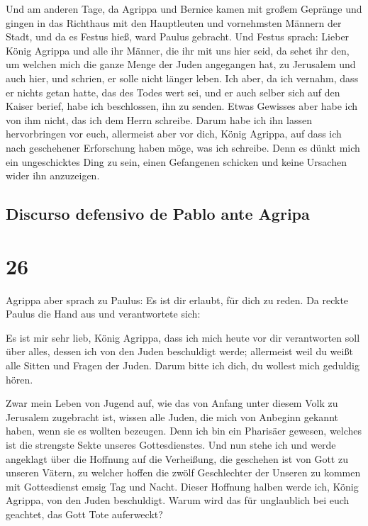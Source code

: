  Und am anderen Tage, da Agrippa und Bernice kamen mit
großem Gepränge und gingen in das Richthaus mit den Hauptleuten und
vornehmsten Männern der Stadt, und da es Festus hieß, ward Paulus
gebracht.  Und Festus sprach: Lieber König Agrippa und
alle ihr Männer, die ihr mit uns hier seid, da sehet ihr den, um welchen
mich die ganze Menge der Juden angegangen hat, zu Jerusalem und auch
hier, und schrien, er solle nicht länger leben.  Ich
aber, da ich vernahm, dass er nichts getan hatte, das des Todes wert
sei, und er auch selber sich auf den Kaiser berief, habe ich
beschlossen, ihn zu senden.  Etwas Gewisses aber habe ich
von ihm nicht, das ich dem Herrn schreibe. Darum habe ich ihn lassen
hervorbringen vor euch, allermeist aber vor dich, König Agrippa, auf
dass ich nach geschehener Erforschung haben möge, was ich schreibe.
 Denn es dünkt mich ein ungeschicktes Ding zu sein, einen
Gefangenen schicken und keine Ursachen wider ihn anzuzeigen.

\hypertarget{discurso-defensivo-de-pablo-ante-agripa}{%
\subsection{Discurso defensivo de Pablo ante
Agripa}\label{discurso-defensivo-de-pablo-ante-agripa}}

\hypertarget{section-25}{%
\section{26}\label{section-25}}

 Agrippa aber sprach zu Paulus: Es ist dir erlaubt, für
dich zu reden. Da reckte Paulus die Hand aus und verantwortete sich:

 Es ist mir sehr lieb, König Agrippa, dass ich mich heute
vor dir verantworten soll über alles, dessen ich von den Juden
beschuldigt werde;  allermeist weil du weißt alle Sitten
und Fragen der Juden. Darum bitte ich dich, du wollest mich geduldig
hören.

 Zwar mein Leben von Jugend auf, wie das von Anfang unter
diesem Volk zu Jerusalem zugebracht ist, wissen alle Juden,
 die mich von Anbeginn gekannt haben, wenn sie es wollten
bezeugen. Denn ich bin ein Pharisäer gewesen, welches ist die strengste
Sekte unseres Gottesdienstes.  Und nun stehe ich und werde
angeklagt über die Hoffnung auf die Verheißung, die geschehen ist von
Gott zu unseren Vätern,  zu welcher hoffen die zwölf
Geschlechter der Unseren zu kommen mit Gottesdienst emsig Tag und Nacht.
Dieser Hoffnung halben werde ich, König Agrippa, von den Juden
beschuldigt.  Warum wird das für unglaublich bei euch
geachtet, das Gott Tote auferweckt?

